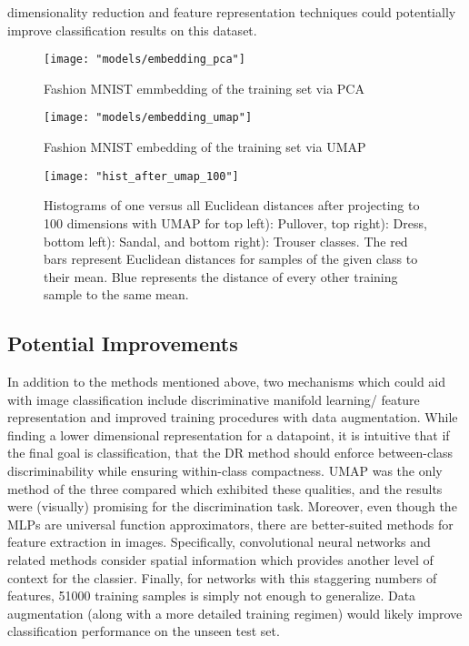 \documentclass[conference]{IEEEtran}
\begin{document}
dimensionality reduction and feature representation techniques could potentially improve classification results on this dataset.

\begin{center}
	\begin{figure}[t]
		\centering
		\texttt{[image: "models/embedding\_pca"]}
		\caption{Fashion MNIST emmbedding of the training set via PCA}
		\label{fig:pca_embedding}
	\end{figure}
\end{center}

\begin{center}
	\begin{figure}[t]
		\centering
		\texttt{[image: "models/embedding\_umap"]}
		\caption{Fashion MNIST embedding of the training set via UMAP}
		\label{fig:umap_embedding}
	\end{figure}
\end{center}

 \begin{center}
	\begin{figure}[t]
		\centering
		\texttt{[image: "hist\_after\_umap\_100"]}
		\caption{Histograms of one versus all Euclidean distances after projecting to 100 dimensions with UMAP for top left): Pullover, top right): Dress, bottom left): Sandal, and bottom right): Trouser classes.  The red bars represent Euclidean distances for samples of the given class to their mean.  Blue represents the distance of every other training sample to the same mean.}
		\label{fig:hist_after_umap_100}
	\end{figure}
\end{center}

\subsection{Potential Improvements}
In addition to the methods mentioned above, two mechanisms which could aid with image classification include discriminative manifold learning/ feature representation and improved training procedures with data augmentation.  While finding a lower dimensional representation for a datapoint, it is intuitive that if the final goal is classification, that the DR method should enforce between-class discriminability while ensuring within-class compactness.  UMAP was the only method of the three compared which exhibited these qualities, and the results were (visually) promising for the discrimination task.  Moreover, even though the MLPs are universal function approximators, there are better-suited methods for feature extraction in images.  Specifically, convolutional neural networks and related methods consider spatial information which provides another level of context for the classier. Finally, for networks with this staggering numbers of features, 51000 training samples is simply not enough to generalize.  Data augmentation (along with a more detailed training regimen) would likely improve classification performance on the unseen test set.
\end{document}
